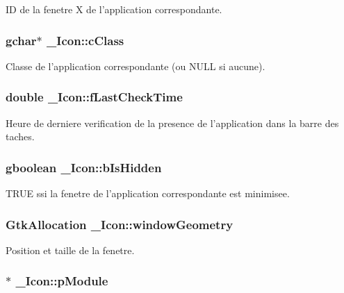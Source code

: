 ID de la fenetre X de l'application correspondante. 

\subsubsection{\setlength{\rightskip}{0pt plus 5cm}gchar$\ast$ {\bf \_\-Icon::cClass}}\label{struct__Icon_5b779d58aeebeedf08bb06131a871e9b}


Classe de l'application correspondante (ou NULL si aucune). 

\subsubsection{\setlength{\rightskip}{0pt plus 5cm}double {\bf \_\-Icon::fLastCheckTime}}\label{struct__Icon_a615848185216245e435335c50a84edb}


Heure de derniere verification de la presence de l'application dans la barre des taches. 

\subsubsection{\setlength{\rightskip}{0pt plus 5cm}gboolean {\bf \_\-Icon::bIsHidden}}\label{struct__Icon_ec7e3513e8e070992c131a08f80819d2}


TRUE ssi la fenetre de l'application correspondante est minimisee. 

\subsubsection{\setlength{\rightskip}{0pt plus 5cm}GtkAllocation {\bf \_\-Icon::windowGeometry}}\label{struct__Icon_182062b6757318f975e5638b90132fe2}


Position et taille de la fenetre. 

\subsubsection{$\ast$ {\bf \_\-Icon::pModule}}\label{struct__Icon_3e869dde23dbc5a378b089546b7f69ee}


